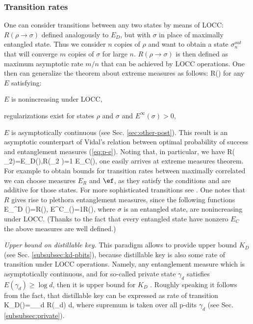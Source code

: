\documentclass[twocolumn,aps,rmp]{revtex4}
\begin{document}
\subsubsection{Transition rates}
\label{subsec:rates}
One can consider transitions between any two states \cite{BDSW1996} by means of LOCC:
$R(\rho\to \sigma)$ defined analogously to $E_D$,
but with $\sigma$ in place of maximally entangled state. Thus we
consider $n$ copies  of $\rho$ and want to obtain  a state $\sigma_n^{out}$
that will converge $m$ copies  of $\sigma$ for large $n$.
$R(\rho\to \sigma)$ is then defined  as maximum asymptotic rate $m/n$ that can be achieved
by LOCC operations.  One then can generalize the theorem about
extreme measures as follows:
\be
R(\rho\to \sigma) 
\label{eq:rates}
\ee
for any $E$ satisfying:
\bee
\item $E$ is nonincreasing under LOCC,
\item regularizations exist for states $\rho$ and $\sigma$ and $E^\infty(\sigma)>0$,
\item $E$ is asymptotically continuous (see Sec. \ref{sec:other-post}).
\eee This result is an asymptotic counterpart of Vidal's relation
between optimal probability of success and entanglement measures
(\ref{eq:p-e}). Noting that, in particular, we have \be R(\rho\to
\psiplus_2)=E_D(\rho),\quad R(\psiplus_2 \to \rho)={1\over
E_C(\rho)}, \ee one easily arrives at extreme measures theorem. For
example to obtain bounds  for  transition rates between maximally
correlated we can choose measures $E_R$ and $\ef$, as they satisfy
the conditions  and are additive for those states.  For more
sophisticated transitions see \cite{MichalSS2002}. One notes that
$R$ gives rise to plethora entanglement measures, since the
following functions \be E_\sigma^D (\rho)=R(\rho\to \sigma),\quad
E^C_\sigma(\rho)={1\over R(\sigma \to \rho)}, \ee where $\sigma$ is
an entangled state, are nonincreasing under LOCC. (Thanks to the
fact that every entangled state have nonzero $E_C$ the above
measures are well defined.)

{\it Upper bound on distillable key.} This paradigm allows to
provide upper bound $K_D$  (see Sec. \ref{subsubsec:kd-pbits}), because
distillable key is also some rate of transition under LOCC
operations. Namely, any entanglement measure which is asymptotically
continuous, and for so-called private state $\gamma_d$ satisfies
$E(\gamma_d)\geq \log d$, then it is upper bound for $K_D$
\cite{Christandl-PhD}. Roughly speaking it follows from the fact,
that distillable key can be expressed as rate of transition \be
K_D(\rho)=\sup_{\gamma_d} R(\rho\to \gamma_d) \log d, \ee where
supremum is taken over all p-dits  $\gamma_d$ (see Sec. \ref{subsubsec:private}).
\end{document}
